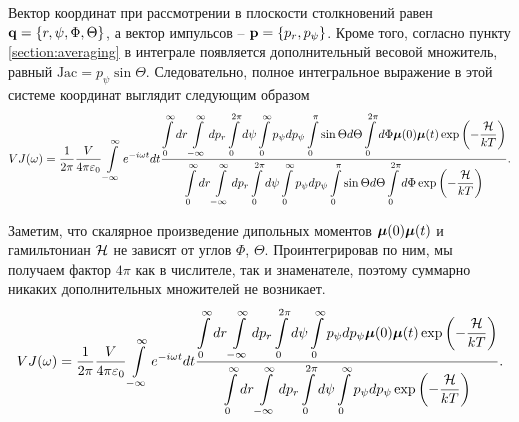 Вектор координат при рассмотрении в плоскости столкновений равен $\mathbf{q} = \left\{ r, \psi, \Phi, \Theta \right\}$, а вектор импульсов -- $\mathbf{p} = \left\{ p_r, p_\psi \right\}$. Кроме того, согласно пункту \ref{section:averaging} в интеграле появляется дополнительный весовой множитель, равный $\text{Jac} = p_\psi \sin \Theta$. Следовательно, полное интегральное выражение в этой системе координат выглядит следующим образом
\begin{gather}
    VJ(\omega) = \frac{1}{2\pi} \frac{V}{4 \pi \varepsilon_0} \int\limits_{-\infty}^\infty e^{-i\omega t} dt \frac{\displaystyle \int\limits_0^\infty dr \int\limits_{-\infty}^\infty dp_r \int\limits_0^{2\pi} d\psi \int\limits_0^\infty p_\psi dp_\psi \int\limits_0^\pi \sin \Theta d\Theta \int\limits_0^{2\pi} d\Phi \boldsymbol{\mu}(0) \boldsymbol{\mu}(t) \exp \left( -\frac{\mathcal{H}}{kT} \right)}{\displaystyle \int\limits_0^\infty dr \int\limits_{-\infty}^\infty dp_r \int\limits_0^{2\pi} d\psi \int\limits_0^\infty p_\psi dp_\psi \int\limits_0^\pi \sin \Theta d\Theta \int\limits_0^{2\pi} d\Phi \exp \left( -\frac{\mathcal{H}}{kT} \right)}. \label{two-atom-spectral-function2}
\end{gather}

Заметим, что скалярное произведение дипольных моментов $\boldsymbol{\mu}(0) \boldsymbol{\mu}(t)$ и гамильтониан $\mathcal{H}$ не зависят от углов $\Phi$, $\Theta$. Проинтегрировав по ним, мы получаем фактор $4 \pi$ как в числителе, так и знаменателе, поэтому суммарно никаких дополнительных множителей не возникает.
\begin{gather}
    VJ(\omega) = \frac{1}{2 \pi} \frac{V}{4 \pi \varepsilon_0} \int\limits_{-\infty}^\infty e^{-i\omega t} dt \frac{\displaystyle \int\limits_0^\infty dr \int\limits_{-\infty}^\infty dp_r \int\limits_0^{2\pi} d\psi \int\limits_0^\infty p_\psi dp_\psi \boldsymbol{\mu}(0) \boldsymbol{\mu}(t) \exp \left( -\frac{\mathcal{H}}{kT} \right)}{\displaystyle \int\limits_0^\infty dr \int\limits_{-\infty}^\infty dp_r \int\limits_0^{2\pi} d\psi \int\limits_0^\infty p_\psi dp_\psi \exp \left( -\frac{\mathcal{H}}{kT} \right)}. \label{two-atom-spectral-function3}
\end{gather}

